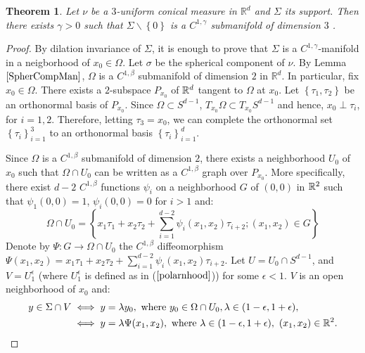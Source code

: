 \documentclass[11pt]{article}
\newtheorem{theorem}{Theorem}[section]
\theoremstyle{definition}
\theoremstyle{remark}
\numberwithin{equation}{section}
\begin{document}
 \begin{theorem}\label{onesingularity} Let $\nu$ be a $3$-uniform conical measure in $\mathbb{R}^d$ and $\Sigma$ its support. Then there exists $\gamma>0$ such that $\Sigma \backslash \left\lbrace0\right\rbrace$ is a $C^{1,\gamma}$ submanifold of dimension $3$ . \end{theorem}
 
  \begin{proof} 
By dilation invariance of $\Sigma$, it is enough to prove that $\Sigma$ is a $C^{1,\gamma}$-manifold in a neigborhood of $x_0 \in \Omega$.
  Let $\sigma$ be the spherical component of $\nu$. By Lemma $\ref{SpherCompMan}$, $\Omega$ is a $C^{1,\beta}$ submanifold of dimension $2$ in $\mathbb{R}^d$. In particular, fix $x_0 \in \Omega$. There exists a $2$-subspace $P_{x_0}$ of ${\mathbb{R}}^d$ tangent to $\Omega$ at $x_0$. Let $\left\lbrace \tau_1, \tau_2 \right\rbrace$ be an orthonormal basis of $P_{x_0}$.
 Since $\Omega \subset S^{d-1}$, $T_{x_0} \Omega \subset T_{x_0} S^{d-1}$ and hence, $x_0 \perp \tau_{i}$, for $i=1,2$. Therefore, letting $\tau_3 = x_0$, we can complete the orthonormal set ${\left\lbrace\tau_i \right\rbrace}_{i=1}^{3}$ to an orthonormal basis ${\left\lbrace \tau_i\right\rbrace}_{i=1}^{d}$. 
 
 Since $\Omega$ is a $C^{1,\beta}$ submanifold of dimension $2$, there exists a neighborhood $U_0$ of $x_0$ such that $\Omega \cap U_{0}$ can be written as a $C^{1,\beta}$ graph over $P_{x_0}$. More specifically, there exist $d-2$ $C^{1,\beta}$ functions $\psi_i$ on a neighborhood $G$ of $(0,0)$ in $\mathbb{R}^{2}$ such that $\psi_1(0,0)=1$,  $\psi_{i}(0,0)=0$ for $i>1$ and: 
  \begin{equation}
 \Omega \cap U_0=\left\lbrace x_1 \tau_1 + x_2 \tau_2 + \sum_{i=1}^{d-2} \psi_{i}(x_1,x_2) \tau_{i+2}; (x_1,x_2) \in G \right\rbrace
 \end{equation}
 Denote by $\Psi: G \rightarrow {\Omega \cap U_0}$ the $C^{1,\beta}$ diffeomorphism $\Psi(x_1,x_2)= x_1 \tau_1 + x_2 \tau_2 + \sum_{i=1}^{d-2} \psi_{i}(x_1,x_2) \tau_{i+2}$.
 Let $U=U_{0} \cap S^{d-1}$, and $V=U_{1}^{\epsilon}$ (where $U_{1}^{\epsilon}$ is defined as in ($\ref{polarnhood}$)) for some $\epsilon <1$. $V$ is an open neighborhood of $x_0$ and: \begin{align}
 y \in \Sigma \cap V & \iff y= \lambda y_0 , \text{ where } y_0 \in \Omega \cap  U_{0}, { } \lambda \in (1-\epsilon, 1+\epsilon), \\ & \iff y = \lambda \Psi(x_1,x_2), \text{ where } \lambda \in (1-\epsilon, 1+ \epsilon), \text{ } (x_1,x_2) \in {\mathbb{R}}^{2}. \end{align}
 

\end{proof}
\end{document}
